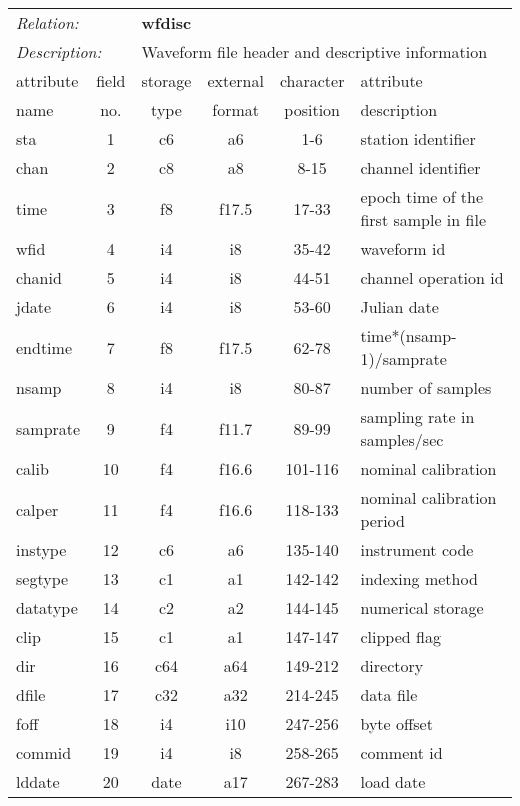 \begin{center}
\begin{tabular*}{1.0\textwidth}{@{\extracolsep{\fill}}|lccccl|}  \hline
\multicolumn{2}{|l}{{\it Relation:}} & \multicolumn{4}{l|}{{\bf wfdisc}} \\
\multicolumn{2}{|l}{{\it Description:}} & \multicolumn{4}{l|}{Waveform file header and descriptive information} \\ \cline{1-6}
\multicolumn{1}{|l}{attribute \vspace{-0.07 in}} & \multicolumn{1}{c}{field} & \multicolumn{1}{c}{storage} & \multicolumn{1}{c}{external} & \multicolumn{1}{c}{character} & \multicolumn{1}{l|}{attribute} \\
\multicolumn{1}{|l}{name} &  \multicolumn{1}{c}{no.} & \multicolumn{1}{c}{type} & \multicolumn{1}{c}{format} & \multicolumn{1}{c}{position} & \multicolumn{1}{l|}{description} \\ \hline\hline
sta     & 1  &   c6   &  a6    &    1-6   & station identifier \\
chan    & 2  &   c8   &  a8    &    8-15  & channel identifier \\
time    & 3  &   f8   &  f17.5 &   17-33  & epoch time of the first sample in file \\
wfid    & 4  &   i4   &  i8    &   35-42  & waveform id \\
chanid  & 5  &   i4   &  i8    &   44-51  & channel operation id \\
jdate   & 6  &   i4   &  i8    &   53-60  & Julian date \\
endtime & 7  &   f8   &  f17.5 &   62-78  & time*(nsamp-1)/samprate \\
nsamp   & 8  &   i4   &  i8    &   80-87  & number of samples \\
samprate& 9  &   f4   &  f11.7 &   89-99  & sampling rate in samples/sec \\
calib   &10  &   f4   &  f16.6 &  101-116 & nominal calibration \\
calper  &11  &   f4   &  f16.6 &  118-133 & nominal calibration period \\
instype &12  &   c6   &  a6    &  135-140 & instrument code \\
segtype &13  &   c1   &  a1    &  142-142 & indexing method \\
datatype&14  &   c2   &  a2    &  144-145 & numerical storage \\
clip    &15  &   c1   &  a1    &  147-147 & clipped flag \\
dir     &16  &   c64  &  a64   &  149-212 & directory \\
dfile   &17  &   c32  &  a32   &  214-245 & data file \\
foff    &18  &   i4   &  i10   &  247-256 & byte offset \\
commid  &19  &   i4   &  i8    &  258-265 & comment id \\
lddate  &20  &  date  &  a17   &  267-283 & load date \\ \cline{1-6}
\end{tabular*}
\end{center}

